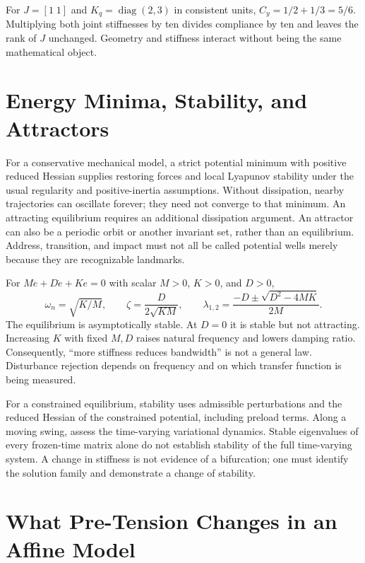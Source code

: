 For $J=[1\;1]$ and $K_q=\operatorname{diag}(2,3)$ in consistent units,
$C_y=1/2+1/3=5/6$. Multiplying both joint stiffnesses by ten divides compliance
by ten and leaves the rank of $J$ unchanged. Geometry and stiffness interact
without being the same mathematical object.

\section{Energy Minima, Stability, and Attractors}
\label{sec:attractors}

For a conservative mechanical model, a strict potential minimum with positive
reduced Hessian supplies restoring forces and local Lyapunov stability under
the usual regularity and positive-inertia assumptions. Without dissipation,
nearby trajectories can oscillate forever; they need not converge to that
minimum. An attracting equilibrium requires an additional dissipation argument.
An attractor can also be a periodic orbit or another invariant set, rather than
an equilibrium. Address, transition, and impact must not all be called potential
wells merely because they are recognizable landmarks.

For $M\ddot e+D\dot e+Ke=0$ with scalar $M>0$, $K>0$, and $D>0$,
\begin{equation}
\omega_n=\sqrt{K/M},\qquad \zeta=\frac{D}{2\sqrt{KM}},\qquad
\lambda_{1,2}=\frac{-D\pm\sqrt{D^2-4MK}}{2M}.
\end{equation}
The equilibrium is asymptotically stable. At $D=0$ it is stable but not
attracting. Increasing $K$ with fixed $M,D$ raises natural frequency and lowers
damping ratio. Consequently, ``more stiffness reduces bandwidth'' is not a
general law. Disturbance rejection depends on frequency and on which transfer
function is being measured.

For a constrained equilibrium, stability uses admissible perturbations and the
reduced Hessian of the constrained potential, including preload terms. Along
a moving swing, assess the time-varying variational dynamics. Stable eigenvalues
of every frozen-time matrix alone do not establish stability of the full
time-varying system. A change in stiffness is not evidence of a bifurcation;
one must identify the solution family and demonstrate a change of stability.

\section{What Pre-Tension Changes in an Affine Model}
\label{sec:drift_control_perspective}


